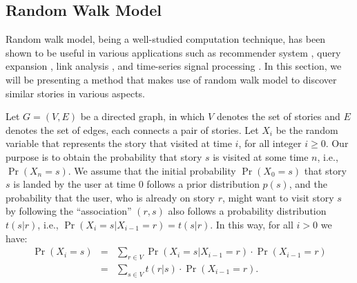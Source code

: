 \documentclass{article}[12pt]
\begin{document}



  

\subsection{Random Walk Model}\label{rwm}

Random walk model, being a well-studied computation technique, has been shown
to be useful in various applications such as recommender system
\cite{cheng2007rvq}, query expansion \cite{collinsthompson2005qeu}, link
analysis \cite{page1998pcr}, and time-series signal processing
\cite{agrawal1993ess}.  In this section, we will be presenting a method that
makes use of random walk model to discover similar stories in various aspects.

Let $G = (V, E)$ be a directed graph, in which $V$ denotes the set of stories
and $E$ denotes the set of edges, each connects a pair of stories.  Let $X_i$
be the random variable that represents the story that visited at time $i$, for
all integer $i \ge 0$.  Our purpose is to obtain the probability that story $s$
is visited at some time $n$, i.e., $\Pr(X_n = s)$.  We assume that the initial
probability $\Pr(X_0 = s)$ that story $s$ is landed by the user at time 0
follows a prior distribution $p(s)$, and the probability that the user, who is
already on story $r$, might want to visit story $s$ by following the
``association'' $(r,s)$ also follows a probability distribution $t(s|r)$, i.e.,
$\Pr(X_i = s|X_{i-1} = r) = t(s|r)$.  In this way, for all $i > 0$ we have:
\begin{eqnarray*}
\Pr(X_i = s) &=& \sum\limits_{r \in V} \Pr(X_i = s|X_{i-1} = r) \cdot \Pr(X_{i-1} = r)\\
&=& \sum\limits_{s \in V} t(r|s) \cdot \Pr(X_{i-1} = r).
\end{eqnarray*}
\end{document}
